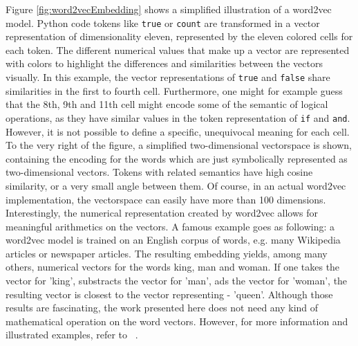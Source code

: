\documentclass[
a4paper,
pagesize,
pdftex,
12pt,
twoside, %
BCOR=5mm, %
ngerman,
fleqn,
final,
]{scrartcl}
\begin{document}
	Figure \ref{fig:word2vecEmbedding} shows a simplified illustration of a word2vec model. Python code tokens like \texttt{true} or \texttt{count} are transformed in a vector representation of dimensionality eleven, represented by the eleven colored cells for each token. The different numerical values that make up a vector are represented with colors to highlight the differences and similarities between the vectors visually. In this example, the vector representations of \texttt{true} and \texttt{false} share similarities in the first to fourth cell. Furthermore, one might for example guess that the 8th, 9th and 11th cell might encode some of the semantic of logical operations, as they have similar values in the token representation of \texttt{if} and \texttt{and}. However, it is not possible to define a specific, unequivocal meaning for each cell.\\
	To the very right of the figure, a simplified two-dimensional vectorspace is shown, containing the encoding for the words which are just symbolically represented as two-dimensional vectors. Tokens with related semantics have high cosine similarity, or a very small angle between them. Of course, in an actual word2vec implementation, the vectorspace can easily have more than 100 dimensions.\\
	Interestingly, the numerical representation created by word2vec allows for meaningful arithmetics on the vectors. A famous example goes as following: a word2vec model is trained on an English corpus of words, e.g. many Wikipedia articles or newspaper articles. The resulting embedding yields, among many others, numerical vectors for the words king, man and woman. If one takes the vector for 'king', substracts the vector for 'man', ads the vector for 'woman', the resulting vector is closest to the vector representing - 'queen'. Although those results are fascinating, the work presented here does not need any kind of mathematical operation on the word vectors. However, for more information and illustrated examples, refer to ~\cite{Word2Vec}.
	
\end{document}
